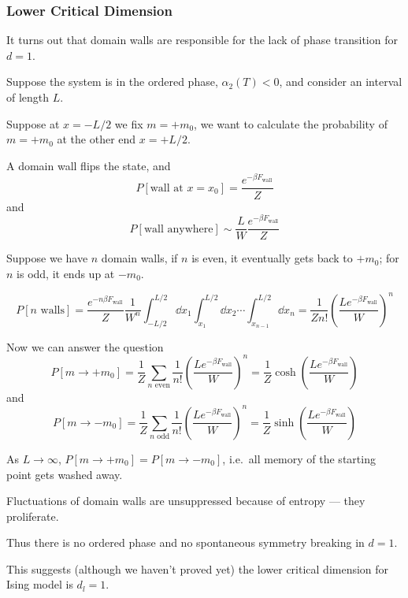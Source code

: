 \documentclass[a4paper,11pt]{article}
\begin{document}
	\subsubsection{Lower Critical Dimension}

	It turns out that domain walls are responsible for the lack of phase transition for $d = 1$.

	Suppose the system is in the ordered phase, $\alpha_2(T)<0$, and consider an interval of length $L$.

	Suppose at $x = -L/2$ we fix $m = + m_0$, we want to calculate the probability of $m = + m_0$ at the other end $x = + L/2$.


	A domain wall flips the state, and
	\[
		P[\text{wall at } x = x_0] = \frac{e ^{-\beta F _{\text{wall}}}}{Z}
	\]
	and
	\[
		P[\text{wall anywhere}] \sim \frac{L}{W} \frac{e ^{-\beta F _{\text{wall}}}}{Z}
	\]

	Suppose we have $n$ domain walls, if $n$ is even, it eventually gets back to $+m_0$; for $n$ is odd, it ends up at $- m_0$.
	
	\[
		P[n \text{ walls}] = \frac{e ^{-n \beta F _{\text{wall}}}}{Z} \frac{1}{W^n} \int_{-L/2}^{L/2} \dd{x_1} \int_{x_1}^{L/2} \dd{x_2} \cdots \int_{x _{n-1}}^{L/2} \dd{x_n} = \frac{1}{Z n!} \left( \frac{L e ^{- \beta F _{\text{wall}}}}{W} \right)^n
	\]
	
	Now we can answer the question
	\[
		P[m \to + m_0] = \frac{1}{Z} \sum _{n \text{ even}} \frac{1}{n!} \left( \frac{L e ^{- \beta F _{\text{wall}}}}{W} \right)^n = \frac{1}{Z} \cosh(\frac{L e ^{- \beta F _{\text{wall}}}}{W})
	\]
	and
	\[
		P[m \to - m_0] = \frac{1}{Z} \sum _{n \text{ odd}} \frac{1}{n!} \left( \frac{L e ^{- \beta F _{\text{wall}}}}{W} \right)^n = \frac{1}{Z} \sinh(\frac{L e ^{- \beta F _{\text{wall}}}}{W})
	\]

	As $L \to \infty$, $P[m \to + m_0] = P[m \to - m_0]$, i.e.\ all memory of the starting point gets washed away.

	Fluctuations of domain walls are unsuppressed because of entropy --- they proliferate.

	Thus there is no ordered phase and no spontaneous symmetry breaking in $d = 1$.
	
	This suggests (although we haven't proved yet) the lower critical dimension for Ising model is $d_l = 1$.

	
\end{document}

